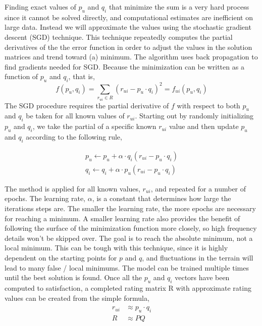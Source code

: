 \documentclass[11pt,a4paper]{article}
\begin{document}
Finding exact values of $p_u$ and $q_i$ that minimize the sum is a very hard process since it cannot be solved directly, and computational estimates are inefficient on large data. Instead we will approximate the values using the stochastic gradient descent (SGD) technique. This technique repeatedly computes the partial derivatives of the the error function in order to adjust the values in the solution matrices and trend toward (a) minimum. The algorithm uses back propagation to find gradients needed for SGD. Because the minimization can be written as a function of $p_u$ and $q_i$, that is,
\begin{equation}
    f(p_u, q_i) = \sum_{r_{ui} \in R} (r_{ui} - p_u \cdot q_i)^2 = f_{ui}(p_u, q_i)
\end{equation}
The SGD procedure requires the partial derivative of $f$ with respect to both $p_u$ and $q_i$ be taken for all known values of $r_{ui}$.
Starting out by randomly initializing $p_u$ and $q_i$, we take the partial of a specific known $r_{ui}$ value and then update $p_u$ and $q_i$ according to the following rule,

\begin{align*}
    p_u \leftarrow p_u + \alpha \cdot q_i(r_{ui} - p_u \cdot q_i) \\
    q_i \leftarrow q_i + \alpha \cdot p_u(r_{ui} - p_u \cdot q_i)
\end{align*}

The method is applied for all known values, $r_{ui}$, and repeated for a number of epochs. The learning rate, $\alpha$, is a constant that determines how large the iterations steps are. The smaller the learning rate, the more epochs are necessary for reaching a minimum. A smaller learning rate also provides the benefit of following the surface of the minimization function more closely, so high frequency details won't be skipped over. The goal is to reach the absolute minimum, not a local minimum. This can be tough with this technique, since it is highly dependent on the starting points for $p$ and $q$, and fluctuations in the terrain will lead to many false / local minimums. The model can be trained multiple times until the best solution is found. Once all the $p_u$ and $q_i$ vectors have been computed to satisfaction, a completed rating matrix R with approximate rating values can be created from the simple formula,
\begin{align*}
    \hat{r}_{ui} & \approx p_u \cdot q_i \\
    R            & \approx P Q
\end{align*}
\end{document}
